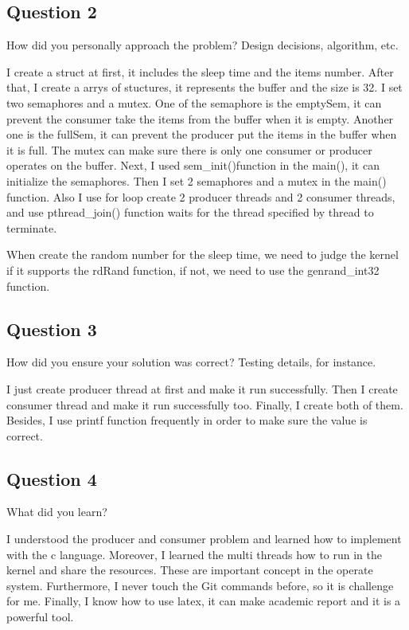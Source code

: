 \documentclass[10pt,draftclsnofoot,peerreview,letterpaper,onecolumn,]{IEEEtran}
\begin{document}
\subsection{Question 2}

How did you personally approach the problem? Design decisions, algorithm, etc.

I create a struct at first, it includes the sleep time and the items number. After that, I create a arrys of stuctures, it represents the buffer and the size is 32. I set two semaphores and a mutex. One of the semaphore is the emptySem, it can prevent the consumer take the items from the buffer when it is empty. Another one is the fullSem, it can prevent the producer put the items in the buffer when it is full. The mutex can make sure there is only one consumer or producer operates on the buffer. Next, I used sem\_init()function in the main(), it can initialize the semaphores. Then I set 2 semaphores and a mutex in the main() function. Also I use for loop create 2 producer threads and 2 consumer threads, and use pthread\_join() function waits for the thread specified by thread to terminate.

When create the random number for the sleep time, we need to judge the kernel if it supports the rdRand function, if not, we need to use the genrand\_int32 function.

\subsection{Question 3}
How did you ensure your solution was correct? Testing details, for instance.

I just create producer thread at first and make it run successfully. Then I create consumer thread  and make it run successfully too. Finally, I create both of them. Besides, I use printf function frequently in order to make sure the value is correct.

\subsection{Question 4}
What did you learn?

I understood the producer and consumer problem and learned how to implement with the c language. Moreover, I learned the multi threads how to run in the kernel and share the resources. These are important concept in the operate system. Furthermore, I never touch the Git commands before, so it is challenge for me. Finally, I know how to use latex, it can make academic report and it is a powerful tool. 
\end{document}
